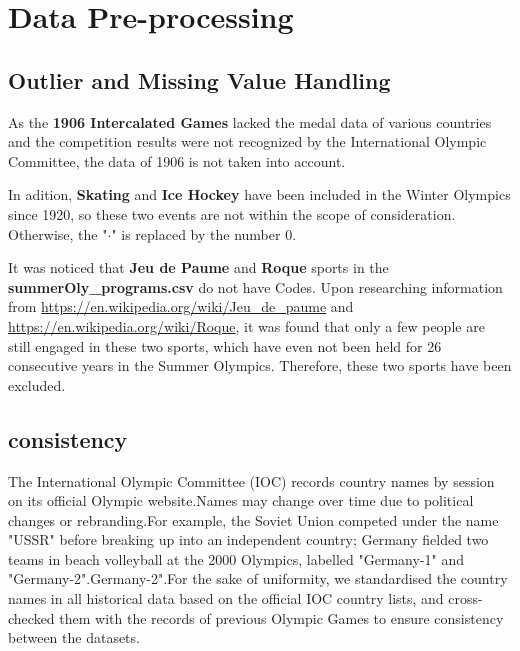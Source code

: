 \documentclass{mcmthesis}
\begin{document}
\section{Data Pre-processing}

\subsection{Outlier and Missing Value Handling}
As the \textbf{1906 Intercalated Games} lacked the medal data of various countries and the competition results were not recognized by the International Olympic Committee, the data of 1906 is not taken into account.

In adition, \textbf{Skating} and \textbf{Ice Hockey} have been included in the Winter Olympics since 1920, so these two events are not within the scope of consideration. Otherwise, the "$\cdot$" is replaced by the number $0$. 

It was noticed that \textbf{Jeu de Paume} and \textbf{Roque} sports in the {\bf summerOly\_programs.csv} do not have Codes. Upon researching information from {\color{blue}\url{https://en.wikipedia.org/wiki/Jeu_de_paume}} and {\color{blue}\url{https://en.wikipedia.org/wiki/Roque}}, it was found that only a few people are still engaged in these two sports, which have even not been held for 26 consecutive years in the Summer Olympics. Therefore, these two sports have been excluded.

\subsection{consistency}
The International Olympic Committee (IOC) records country names by session on its official Olympic website.Names may change over time due to political changes or rebranding.For example, the Soviet Union competed under the name "USSR" before breaking up into an independent country; Germany fielded two teams in beach volleyball at the 2000 Olympics, labelled "Germany-1" and "Germany-2".Germany-2".For the sake of uniformity, we standardised the country names in all historical data based on the official IOC country lists, and cross-checked them with the records of previous Olympic Games to ensure consistency between the datasets.


	
	
	
	
	
	
	
	
	
	
\end{document}
